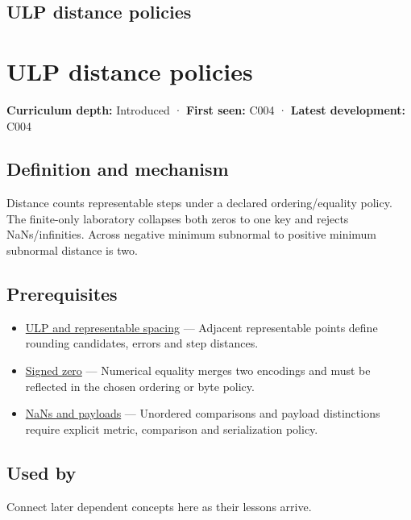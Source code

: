 \hypertarget{appendix-deca299ae4b8}{}
\section*{ULP distance policies}
\chapter{ULP distance policies}\label{appendix-deca299ae4b8-ulp-distance-policies}

\textbf{Curriculum depth:} Introduced · \textbf{First seen:} C004 · \textbf{Latest development:} C004

\section{Definition and mechanism}\label{appendix-deca299ae4b8-definition-and-mechanism}

Distance counts representable steps under a declared ordering/equality policy. The finite-only laboratory collapses both zeros to one key and rejects NaNs/infinities. Across negative minimum subnormal to positive minimum subnormal distance is two.

\section{Prerequisites}\label{appendix-deca299ae4b8-prerequisites}

\begin{itemize}
\tightlist
\item
  \hyperref[appendix-14bab4cab9d4]{ULP and representable spacing} --- Adjacent representable points define rounding candidates, errors and step distances.
\item
  \hyperref[appendix-3a048f032c1f]{Signed zero} --- Numerical equality merges two encodings and must be reflected in the chosen ordering or byte policy.
\item
  \hyperref[appendix-d6607cc4c235]{NaNs and payloads} --- Unordered comparisons and payload distinctions require explicit metric, comparison and serialization policy.
\end{itemize}

\section{Used by}\label{appendix-deca299ae4b8-used-by}

Connect later dependent concepts here as their lessons arrive.

